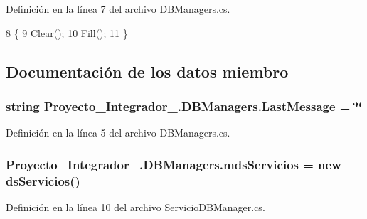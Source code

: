 Definición en la línea 7 del archivo D\-B\-Managers.\-cs.


\begin{DoxyCode}
8         \{
9             \hyperlink{class_proyecto___integrador__3_1_1_d_b_managers_a2af606713823aab2912dd18c719aeb48}{Clear}();
10             \hyperlink{class_proyecto___integrador__3_1_1_d_b_managers_a3766dfbef6eb8494cf1fd9e28a135bd7}{Fill}();
11         \}
\end{DoxyCode}


\subsection{Documentación de los datos miembro}
\hypertarget{class_proyecto___integrador__3_1_1_d_b_managers_aecf2d3981e87f16c1e3a60c7913931a8}{
\subsubsection[{Last\-Message}]{\setlength{\rightskip}{0pt plus 5cm}string Proyecto\-\_\-\-Integrador\-\_.\-D\-B\-Managers.\-Last\-Message = \char`\"{}\char`\"{}}}\label{class_proyecto___integrador__3_1_1_d_b_managers_aecf2d3981e87f16c1e3a60c7913931a8}


Definición en la línea 5 del archivo D\-B\-Managers.\-cs.

\hypertarget{class_proyecto___integrador__3_1_1_d_b_managers_a6b992d164f75898c6f9717fd5b839fa4}{
\subsubsection[{mds\-Servicios}]{ Proyecto\-\_\-\-Integrador\-\_.\-D\-B\-Managers.\-mds\-Servicios = new {\bf ds\-Servicios}()\hspace{0.3cm}{\ttfamily [protected]}}}\label{class_proyecto___integrador__3_1_1_d_b_managers_a6b992d164f75898c6f9717fd5b839fa4}


Definición en la línea 10 del archivo Servicio\-D\-B\-Manager.\-cs.

